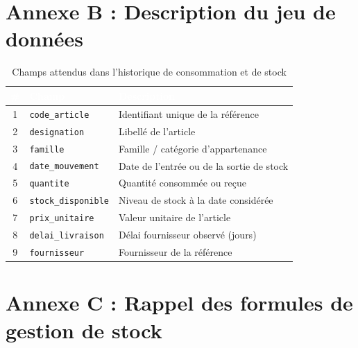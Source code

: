 \documentclass[12pt, a4paper, oneside]{report}
\begin{document}
\section*{Annexe B : Description du jeu de données}

\begin{table}[H]
  \centering
  \caption{Champs attendus dans l'historique de consommation et de stock}
  \label{tab:champs_donnees}
  \renewcommand{\arraystretch}{1.3}
  \small
  \begin{tabularx}{\textwidth}{|c|l|X|}
    \hline
    \rowcolor{iacsTableHead}
    \textcolor{white}{\textbf{\#}} &
    \textcolor{white}{\textbf{Champ}} &
    \textcolor{white}{\textbf{Description}} \\
    \hline
    1 & \texttt{code\_article}     & Identifiant unique de la référence \\
    \hline
    \rowcolor{iacsLightGray}
    2 & \texttt{designation}       & Libellé de l'article \\
    \hline
    3 & \texttt{famille}           & Famille / catégorie d'appartenance \\
    \hline
    \rowcolor{iacsLightGray}
    4 & \texttt{date\_mouvement}   & Date de l'entrée ou de la sortie de stock \\
    \hline
    5 & \texttt{quantite}          & Quantité consommée ou reçue \\
    \hline
    \rowcolor{iacsLightGray}
    6 & \texttt{stock\_disponible} & Niveau de stock à la date considérée \\
    \hline
    7 & \texttt{prix\_unitaire}    & Valeur unitaire de l'article \\
    \hline
    \rowcolor{iacsLightGray}
    8 & \texttt{delai\_livraison}  & Délai fournisseur observé (jours) \\
    \hline
    9 & \texttt{fournisseur}       & Fournisseur de la référence \\
    \hline
  \end{tabularx}
\end{table}


\section*{Annexe C : Rappel des formules de gestion de stock}
\end{document}
